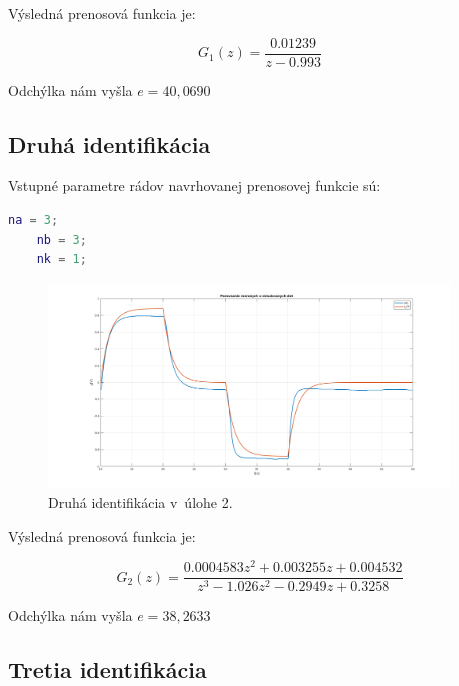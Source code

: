 \documentclass{article}
\begin{document}
Výsledná prenosová funkcia je:

\begin{equation}
	G_1(z) = \frac{0.01239}{z - 0.993}
	\label{eq:I1}
\end{equation}

Odchýlka nám vyšla $e = 40,0690$

\clearpage

\subsection{Druhá identifikácia}
\label{subsec:I2}

Vstupné parametre rádov navrhovanej prenosovej funkcie sú:

\begin{lstlisting}[language=Matlab]
	na = 3;
	nb = 3;
	nk = 1;
\end{lstlisting}

\begin{figure}[!htbp]
	\begin{center}
		\includegraphics[width=0.95\textwidth]{include/I2.png}
	\end{center}
	\caption{Druhá identifikácia v~úlohe 2.}
	\label{fig:I2}
\end{figure}

Výsledná prenosová funkcia je:

\begin{equation}
	G_2(z) = \frac{0.0004583 z^2 + 0.003255 z + 0.004532}{z^3 - 1.026 z^2 - 0.2949 z + 0.3258}
	\label{eq:I2}
\end{equation}

Odchýlka nám vyšla $e = 38,2633$

\clearpage

\subsection{Tretia identifikácia}
\label{subsec:I3}
\end{document}
